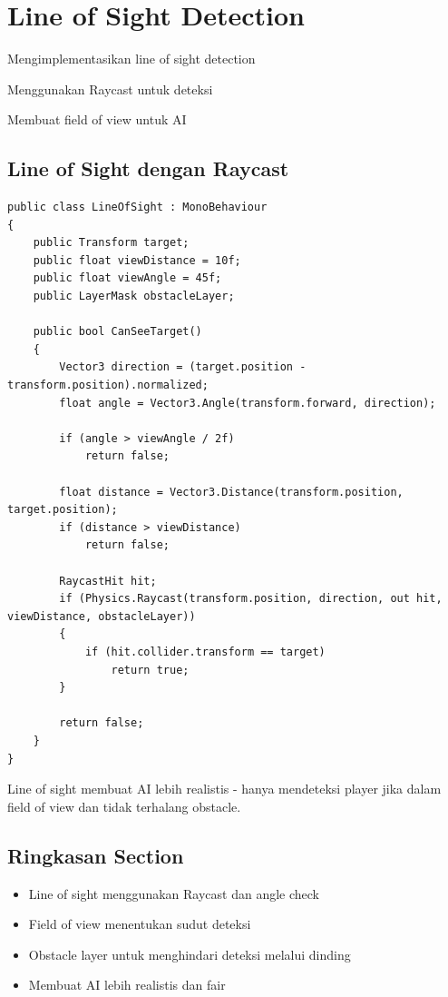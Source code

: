 
\section{Line of Sight Detection}

\begin{learningoutcomes}
\item Mengimplementasikan line of sight detection
\item Menggunakan Raycast untuk deteksi
\item Membuat field of view untuk AI
\end{learningoutcomes}

\subsection{Line of Sight dengan Raycast}

\begin{lstlisting}[language={[Sharp]C}]
public class LineOfSight : MonoBehaviour
{
    public Transform target;
    public float viewDistance = 10f;
    public float viewAngle = 45f;
    public LayerMask obstacleLayer;
    
    public bool CanSeeTarget()
    {
        Vector3 direction = (target.position - transform.position).normalized;
        float angle = Vector3.Angle(transform.forward, direction);
        
        if (angle > viewAngle / 2f)
            return false;
        
        float distance = Vector3.Distance(transform.position, target.position);
        if (distance > viewDistance)
            return false;
        
        RaycastHit hit;
        if (Physics.Raycast(transform.position, direction, out hit, viewDistance, obstacleLayer))
        {
            if (hit.collider.transform == target)
                return true;
        }
        
        return false;
    }
}
\end{lstlisting}

\begin{catatan}
Line of sight membuat AI lebih realistis - hanya mendeteksi player jika dalam field of view dan tidak terhalang obstacle.
\end{catatan}

\subsection{Ringkasan Section}

\begin{itemize}
\item Line of sight menggunakan Raycast dan angle check
\item Field of view menentukan sudut deteksi
\item Obstacle layer untuk menghindari deteksi melalui dinding
\item Membuat AI lebih realistis dan fair
\end{itemize}
